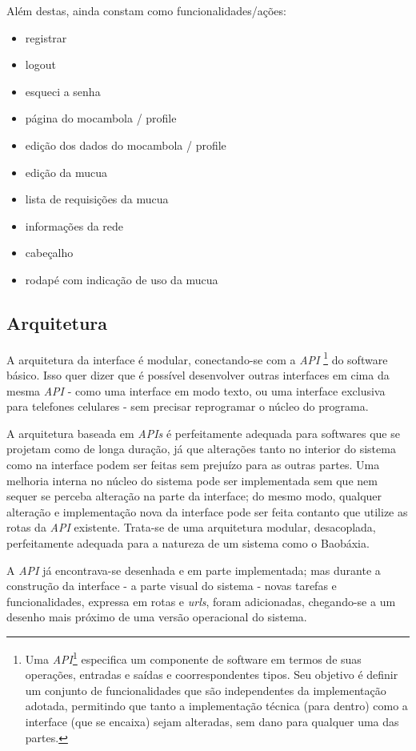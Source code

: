 Além destas, ainda constam como funcionalidades/ações:
\begin{itemize}
  \item registrar
  \item logout
  \item esqueci a senha
  \item página do mocambola / profile
  \item edição dos dados do mocambola / profile
  \item edição da mucua
  \item lista de requisições da mucua
  \item informações da rede
  \item cabeçalho
  \item rodapé com indicação de uso da mucua
\end{itemize}    

\subsection{Arquitetura}
A arquitetura da interface é modular, conectando-se com a \emph{API}
\footnote{Uma \emph{API}\footnote{Application programming interface}
  especifica um componente de software em termos de suas operações,
  entradas e saídas e coorrespondentes tipos. Seu objetivo é definir
  um conjunto de funcionalidades que são independentes da implementação
  adotada, permitindo que tanto a implementação técnica (para dentro)
  como a interface (que se encaixa) sejam alteradas, sem dano para
  qualquer uma das partes.} do software básico. Isso quer dizer que
é possível desenvolver outras interfaces em cima da mesma \emph{API}
- como uma interface em modo texto, ou uma interface exclusiva para
telefones celulares - sem precisar reprogramar o núcleo do programa.

A arquitetura baseada em \emph{APIs} é perfeitamente adequada para
softwares que se projetam como de longa duração, já que alterações
tanto no interior do sistema como na interface podem ser feitas sem
prejuízo para as outras partes. Uma melhoria interna no núcleo do sistema
pode ser implementada sem que nem sequer se perceba alteração na parte
da interface; do mesmo modo, qualquer alteração e implementação nova da
interface pode ser feita contanto que utilize as rotas da \emph{API}
existente. Trata-se de uma arquitetura modular, desacoplada,
perfeitamente adequada para a natureza de um sistema como o Baobáxia.

A \emph{API} já encontrava-se desenhada e em parte implementada; mas
durante a construção da interface - a parte visual do sistema - novas
tarefas e funcionalidades, expressa em rotas e \emph{urls}, foram
adicionadas, chegando-se a um desenho mais próximo de uma versão
operacional do sistema. 


